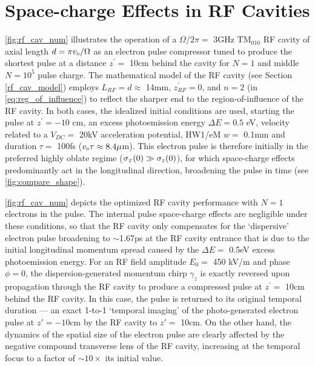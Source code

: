 
\section{Space-charge Effects in RF Cavities} \label{sec:rf_cav_charge}



\ref{fig:rf_cav_num} illustrates the operation of a $ \Omega / 2 \pi = $ 3GHz $\text{TM}_{010}$ RF cavity of axial length $ d = \pi v_{{\scriptscriptstyle 0}} / \Omega $ as an electron pulse compressor tuned to produce the shortest pulse at a distance $ z^{\prime} = $ 10cm behind the cavity for $N=1$ and middle $N=10^5$ pulse charge.
The mathematical model of the RF cavity (see Section \ref{rf_cav_model}) employs $L_{RF} = d \approx $ 14mm, $ z^{\prime}_{RF} = 0 $, and $n=2$ (in \ref{eq:reg_of_influence}) to reflect the sharper end to the region-of-influence of the RF cavity.
In both cases, the idealized initial conditions are used, starting the pulse at $ z^{\prime} = -10$ cm, an excess photoemission energy $\Delta E = 0.5$ eV, velocity related to a $V_{DC} = $ 20kV acceleration potential, HW1/eM $ w = $ 0.1mm and duration $\tau = $ 100fs ($v_{{\scriptscriptstyle 0}} \tau \approx 8.4 \mu$m).
This electron pulse is therefore initially in the preferred highly oblate regime ($ \sigma_{{\scriptscriptstyle T}}(0) \gg \sigma_{z} (0) $), for which space-charge effects predominantly act in the longitudinal direction, broadening the pulse in time (see \ref{fig:compare_shape}).

\ref{fig:rf_cav_num} depicts the optimized RF cavity performance with $N=1$ electrons in the pulse.
The internal pulse space-charge effects are negligible under these conditions, so that the RF cavity only compensates for the `dispersive' electron pulse broadening to $\sim$1.67ps at the RF cavity entrance that is due to the initial longitudinal momentum spread caused by the $\Delta E = $ 0.5eV excess photoemission energy.
For an RF field amplitude $E_{0} = $ 450 kV/m and phase $\phi = 0$, the dispersion-generated momentum chirp $\gamma_{z}$ is exactly reversed upon propagation through the RF cavity to produce a compressed pulse at $ z^{\prime} = $ 10cm behind the RF cavity.
In this case, the pulse is returned to its original temporal duration --- an exact 1-to-1 `temporal imaging' of the photo-generated electron pulse at $z' = -10$cm by the RF cavity to $ z' = $ 10cm.
On the other hand, the dynamics of the spatial size of the electron pulse are clearly affected by the negative compound transverse lens of the RF cavity, increasing at the temporal focus to a factor of $\sim 10\times$ its initial value.

